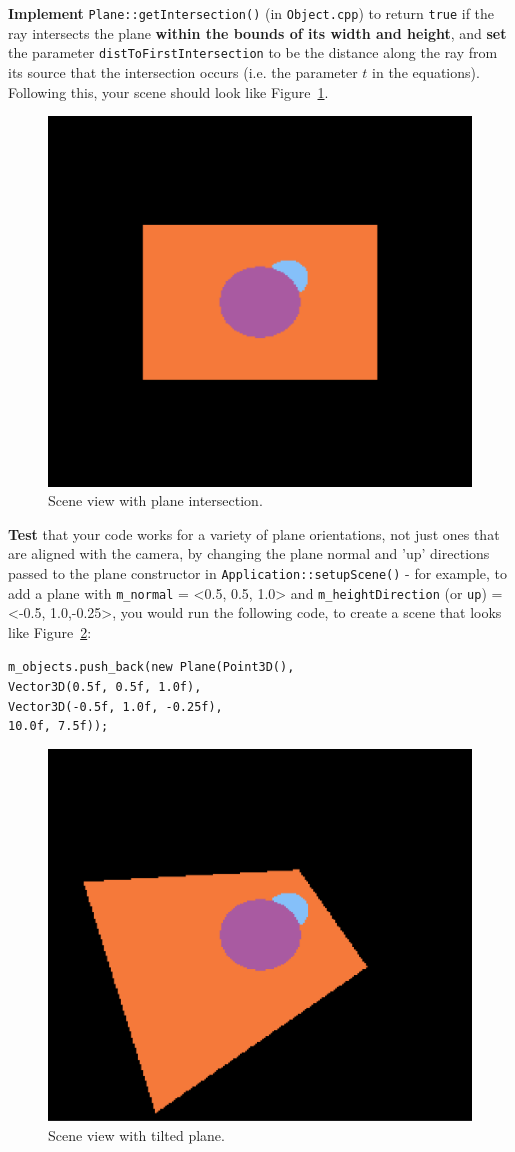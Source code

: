 \documentclass{../../../fal_assignment}
\begin{document}
\textbf{Implement} \lstinline{Plane::getIntersection()} (in \texttt{Object.cpp}) to return \lstinline{true} if the ray intersects the plane \textbf{within the bounds of its width and height}, and \textbf{set} the parameter \lstinline{distToFirstIntersection} to be the distance along the ray from its source that the intersection occurs (i.e. the parameter $t$ in the equations). Following this, your scene should look like Figure~\ref{fig:plane}.

\begin{figure}[ht]
	\begin{center}
		\includegraphics[width=0.25\linewidth]{plane}
	\end{center}
	\caption{Scene view with plane intersection.}
	\label{fig:plane}
\end{figure}

\textbf{Test} that your code works for a variety of plane orientations, not just ones that are aligned with the camera, by changing the plane normal and 'up' directions passed to the plane constructor in \lstinline{Application::setupScene()} - for example, to add a plane with \lstinline{m_normal} = <0.5, 0.5, 1.0> and \lstinline{m_heightDirection} (or \lstinline{up}) = <-0.5, 1.0,-0.25>, you would run the following code, to create a scene that looks like Figure~\ref{fig:tilted_plane}:

\lstinline{m_objects.push_back(new Plane(Point3D(),}\\
\hspace*{30mm}\lstinline{Vector3D(0.5f, 0.5f, 1.0f),}\\
\hspace*{30mm}\lstinline{Vector3D(-0.5f, 1.0f, -0.25f),}\\
\hspace*{30mm}\lstinline{10.0f, 7.5f));}

\begin{figure}[ht]
	\begin{center}
		\includegraphics[width=0.25\linewidth]{tilted_plane}
	\end{center}
	\caption{Scene view with tilted plane.}
	\label{fig:tilted_plane}
\end{figure}
\end{document}
